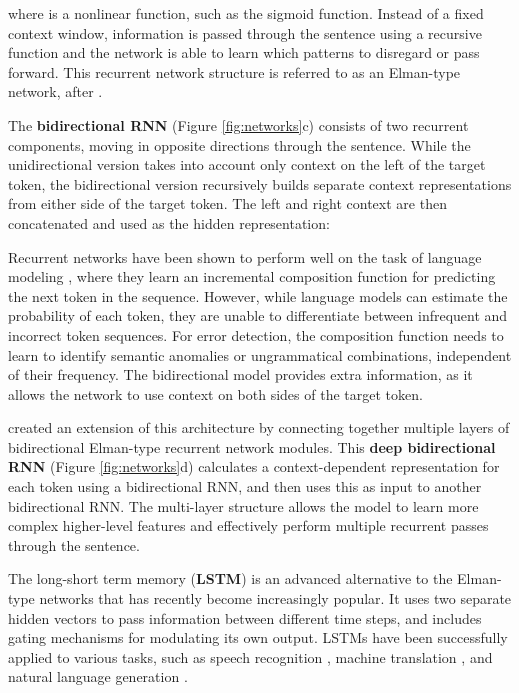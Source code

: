 \documentclass[11pt]{article}
\begin{document}
 

\noindent where  is a nonlinear function, such as the sigmoid function. 
Instead of a fixed context window, information is passed through the sentence using a recursive function and the network is able to learn which patterns to disregard or pass forward.
This recurrent network structure is referred to as an Elman-type network, after .


The \textbf{bidirectional RNN} (Figure \ref{fig:networks}c) consists of two recurrent components, moving in opposite directions through the sentence. While the unidirectional version takes into account only context on the left of the target token, the bidirectional version recursively builds separate context representations from either side of the target token. The left and right context are then concatenated and used as the hidden representation:

 

 

 



Recurrent networks have been shown to perform well on the task of language modeling \cite{Kombrinka,Chelba2014}, where they learn an incremental composition function for predicting the next token in the sequence. 
However, while language models can estimate the probability of each token, they are unable to differentiate between infrequent and incorrect token sequences.
For error detection, the composition function needs to learn to identify semantic anomalies or ungrammatical combinations, independent of their frequency.
The bidirectional model provides extra information, as it allows the network to use context on both sides of the target token.

 created an extension of this architecture by connecting together multiple layers of bidirectional Elman-type recurrent network modules. This \textbf{deep bidirectional RNN} (Figure \ref{fig:networks}d) calculates a context-dependent representation for each token using a bidirectional RNN, and then uses this as input to another bidirectional RNN.
The multi-layer structure allows the model to learn more complex higher-level features and effectively perform multiple recurrent passes through the sentence.



The long-short term memory (\textbf{LSTM}) \cite{Hochreiter1997} is an advanced alternative to the Elman-type networks that has recently become increasingly popular. 
It uses two separate hidden vectors to pass information between different time steps, and includes gating mechanisms for modulating its own output.
LSTMs have been successfully applied to various tasks, such as speech recognition \cite{Graves2013a}, machine translation \cite{Luong2015}, and natural language generation \cite{Wen2015}. 
\end{document}
